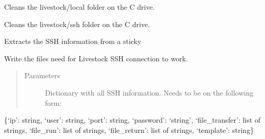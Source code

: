 \documentclass[letterpaper,10pt,english]{sphinxmanual}
\begin{document}
\begin{fulllineitems}
\label{\detokenize{lib:livestock.lib.ssh.clean_local_folder}}
Cleans the livestock/local folder on the C drive.

\end{fulllineitems}


\begin{fulllineitems}
\label{\detokenize{lib:livestock.lib.ssh.clean_ssh_folder}}
Cleans the livestock/ssh folder on the C drive.

\end{fulllineitems}


\begin{fulllineitems}
\label{\detokenize{lib:livestock.lib.ssh.get_ssh}}
Extracts the SSH information from a sticky

\end{fulllineitems}


\begin{fulllineitems}
\label{\detokenize{lib:livestock.lib.ssh.write_ssh_commands}}
Write the files need for Livestock SSH connection to work.
\begin{quote}\begin{description}
\item[{Parameters}] \leavevmode
{} \textendash{} Dictionary with all SSH information. Needs to be on the following form:

\end{description}\end{quote}

\{‘ip’: string, ‘user’: string,
‘port’: string, ‘password’: ‘string’,
‘file\_transfer’: list of strings, ‘file\_run’: list of strings,
‘file\_return’: list of strings, ‘template’: string\}

\end{fulllineitems}
\end{document}
